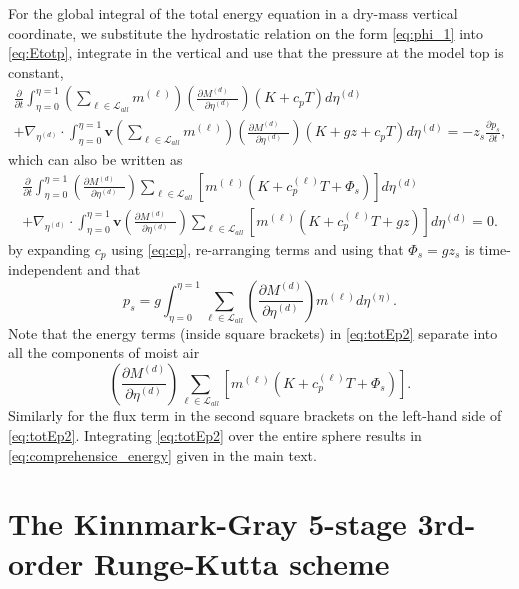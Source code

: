 \documentclass{agujournal}
\begin{document}
For the global integral of the total energy equation in a dry-mass vertical coordinate, we substitute the hydrostatic relation on the form \eqref{eq:phi_1} into \eqref{eq:Etotp}, integrate in the vertical and use that the pressure at the model top is constant,
\begin{multline}
\frac{\partial }{\partial t}\int_{\eta=0}^{\eta=1} \left( \sum_{\ell \in \mathcal{L}_{all}} m^{(\ell)}\right) \left( \frac{\partial M^{(d)}\quad }{\partial \eta^{(d)}} \right)\left(K+c_pT\right)d \eta^{(d)}\\ +\nabla_{\eta^{(d)}} \cdot \int_{\eta=0}^{\eta=1} \mathbf{v} \left( \sum_{\ell \in \mathcal{L}_{all}} m^{(\ell)}\right) \left( \frac{\partial M^{(d)}\quad }{\partial \eta^{(d)}} \right)\left( K+gz+c_pT \right) d \eta^{(d)} =-z_s\frac{\partial p_s}{\partial t},\label{eq:tmp99}
\end{multline}
which can also be written as
\begin{multline}
\frac{\partial }{\partial t}\int_{\eta=0}^{\eta=1} \left( \frac{\partial M^{(d)}\quad }{\partial \eta^{(d)}} \right)\sum_{\ell \in \mathcal{L}_{all}} \left[m^{(\ell)} \left(K+c_p^{(\ell)}T+\Phi_s  \right)\right]d \eta^{(d)}\\ +\nabla_{\eta^{(d)}} \cdot \int_{\eta=0}^{\eta=1} \mathbf{v} \left( \frac{\partial M^{(d)}\quad }{\partial \eta^{(d)}} \right)\sum_{\ell \in \mathcal{L}_{all}} \left[ m^{(\ell)}\left(K+c_p^{(\ell)}T+gz\right) \right]d \eta^{(d)} =0.\label{eq:totEp2}
\end{multline}
by expanding $c_p$ using \eqref{eq:cp}, re-arranging terms and using that $\Phi_s=gz_s$ is time-independent and that 
\begin{equation}
p_s=g\int_{\eta=0}^{\eta=1}\sum_{\ell \in \mathcal{L}_{all}}  \left( \frac{\partial M^{(d)}}{\partial \eta^{(d)}}\right) m^{(\ell)}d\eta^{(\eta)}.
\end{equation}
Note that the energy terms (inside square brackets) in \eqref{eq:totEp2} separate into all the components of moist air
\begin{equation}
\left( \frac{\partial M^{(d)}}{\partial \eta^{(d)}} \right)\sum_{\ell \in \mathcal{L}_{all}} \left[ m^{(\ell)}\left(K+c_p^{(\ell)}T+\Phi_s\right)\right].
\end{equation}
Similarly for the flux term in the second square brackets on the left-hand side of \eqref{eq:totEp2}. Integrating \eqref{eq:totEp2} over the entire sphere results in \eqref{eq:comprehensice_energy} given in the main text.

\section{The Kinnmark-Gray 5-stage 3rd-order Runge-Kutta scheme}\label{app:KG53}
\end{document}
